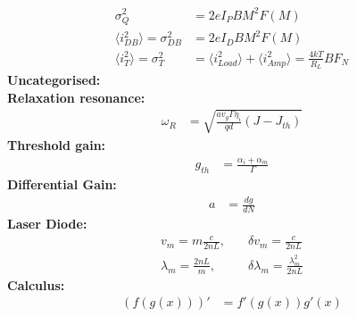 \documentclass[landscape,a4paper]{article}
\begin{document}
\begin{multicols}{3}
\begin{align}
		\sigma_Q^2 &= 2eI_P BM^2 F(M)\\
		\langle i_{DB}^2 \rangle = \sigma_{DB}^2 &= 2eI_D BM^2 F(M)\\
		\langle i_T^2 \rangle = \sigma_T^2 &= \langle i_{Load}^2 \rangle + \langle i_{Amp}^2 \rangle = \frac{4kT}{R_L}BF_N
	\end{align}
	\textbf{Uncategorised:}\\
	\hspace{3mm}\textbf{Relaxation resonance:}
	\begin{align}
		\omega_R &= \sqrt{\frac{a v_g \Gamma \eta_i}{qd} (J-J_{th})}
	\end{align}
	\hspace{3mm}\textbf{Threshold gain:}
	\begin{align}
		g_{th} &= \frac{\alpha_i + \alpha_m}{\Gamma}
	\end{align}
	\hspace{3mm}\textbf{Differential Gain:}
	\begin{align}
		a &= \frac{dg}{dN}
	\end{align}
	\hspace{3mm}\textbf{Laser Diode:}
	\begin{align}
		v_m = m\frac{c}{2nL},&\quad\delta v_m = \frac{c}{2nL}\\
		\lambda_m = \frac{2nL}{m},&\quad\delta\lambda_m = \frac{\lambda_m^2}{2nL}
	\end{align}
	\textbf{Calculus:}
	\begin{align}
		(f(g(x)))' &= f'(g(x))g'(x)
	\end{align}
\end{multicols}
\end{document}
